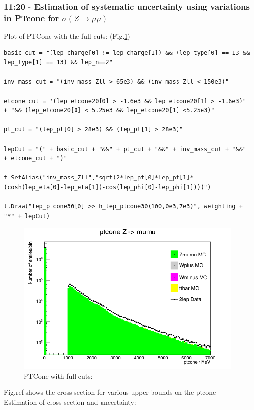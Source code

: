 \subsubsection*{11:20 - Estimation of systematic uncertainty using variations in PTcone for $\sigma (Z \rightarrow \mu\mu)$}
Plot of PTCone with the full cuts: (Fig.\ref{fig:11:00_05-03-21})
\begin{lstlisting}
basic_cut = "(lep_charge[0] != lep_charge[1]) && (lep_type[0] == 13 && lep_type[1] == 13) && lep_n==2"
 
inv_mass_cut = "(inv_mass_Zll > 65e3) && (inv_mass_Zll < 150e3)"

etcone_cut = "(lep_etcone20[0] > -1.6e3 && lep_etcone20[1] > -1.6e3)" + "&& (lep_etcone20[0] < 5.25e3 && lep_etcone20[1] <5.25e3)"

pt_cut = "(lep_pt[0] > 28e3) && (lep_pt[1] > 28e3)"
    
lepCut = "(" + basic_cut + "&&" + pt_cut + "&&" + inv_mass_cut + "&&" + etcone_cut + ")"

t.SetAlias("inv_mass_Zll","sqrt(2*lep_pt[0]*lep_pt[1]*(cosh(lep_eta[0]-lep_eta[1])-cos(lep_phi[0]-lep_phi[1])))")
   
t.Draw("lep_ptcone30[0] >> h_lep_ptcone30(100,0e3,7e3)", weighting + "*" + lepCut)
\end{lstlisting}
\begin{figure}[h!]
    \centering
	\includegraphics[width=0.85\linewidth]{plots/05-03-2021/11-20_05-03-21.png}
    \caption{PTCone with full cuts:}
    \label{fig:11:00_05-03-21}
\end{figure}
Fig.ref{} shows the cross section for various upper bounds on the ptcone
\\
Estimation of cross section and uncertainty:

